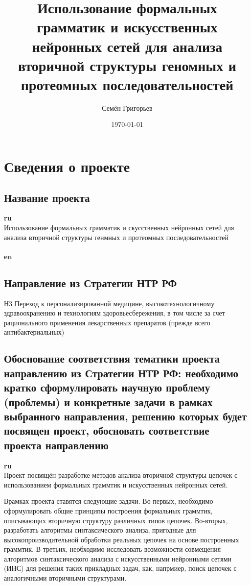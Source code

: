 ﻿\documentclass[12pt]{article}  %
\title{Использование формальных грамматик и искусственных нейронных сетей для анализа вторичной структуры геномных и протеомных  последовательностей}
\author{Семён Григорьев}
\date{\today}
\theoremstyle{remark}
\begin{document}

\maketitle

\section{Сведения о проекте}

\subsection{Название проекта}

\textbf{ru}\\
Использование формальных грамматик и скусственных нейронных сетей для анализа вторичной структуры генмных и протеомных  последовательностей
\\
\\
\textbf{en}\\

\subsection{Направление из Стратегии НТР РФ}
Н3 Переход к персонализированной медицине, высокотехнологичному здравоохранению и технологиям здоровьесбережения, в том числе за счет рационального применения лекарственных препаратов (прежде всего антибактериальных)

\subsection{Обоснование соответствия тематики проекта направлению из Стратегии НТР РФ: необходимо кратко сформулировать научную проблему (проблемы) и конкретные задачи в рамках выбранного направления, решению которых будет посвящен проект, обосновать соответствие проекта направлению}
\textbf{ru}\\
Проект посвящён разработке методов анализа вторичной структуры цепочек с использованием формальных граммтик и искусственных нейронных сетей.

Врамках проекта ставятся следующие задачи.
Во-первых, необходимо сформулировать общие принципы построения формальных граммтик, описывающих вторичную структуру различных типов цепочек.
Во-вторых, разработать алгоритмы синтаксического анализа, пригодные для высокопроизводительной обработки реальных цепочек на основе построенных граммтик.
В-третьих, необходимо исследовать возможности совмещения алгоритмов синтаксического анализа с искусственными нейронными сетями (ИНС) для решения таких прикладных задач, как, напрмиер, поиск цепочек с аналогичными вторичными структурами.
\end{document}

